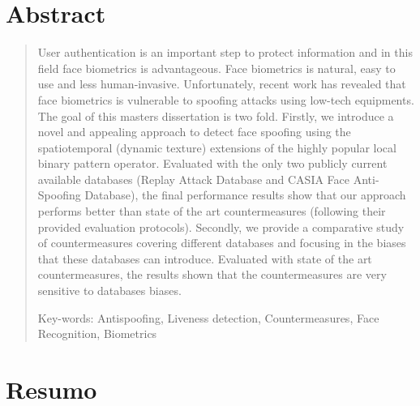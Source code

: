 \chapter*{Abstract}

\begin{quotation}

\noindent 

User authentication is an important step to protect information and in this field face biometrics is advantageous. Face biometrics is natural, easy to use and less human-invasive. Unfortunately, recent work has revealed that face biometrics is vulnerable to spoofing attacks using low-tech equipments. The goal of this masters dissertation is two fold. Firstly, we introduce a novel and appealing approach to detect face spoofing using the spatiotemporal (dynamic texture) extensions of the highly popular local binary pattern operator. Evaluated with the only two publicly current available databases (Replay Attack Database and CASIA Face Anti-Spoofing Database), the final performance results show that our approach performs better than state of the art countermeasures (following their provided evaluation protocols). Secondly, we provide a comparative study of countermeasures covering different databases and focusing in the biases that these databases can introduce. Evaluated with state of the art countermeasures, the results shown that the countermeasures are very sensitive to databases biases. 

\vspace*{0.5cm}

\noindent Key-words:  Antispoofing, Liveness detection, Countermeasures, Face Recognition, Biometrics
\newpage%
\end{quotation}

\newpage
\null



\chapter*{Resumo}


